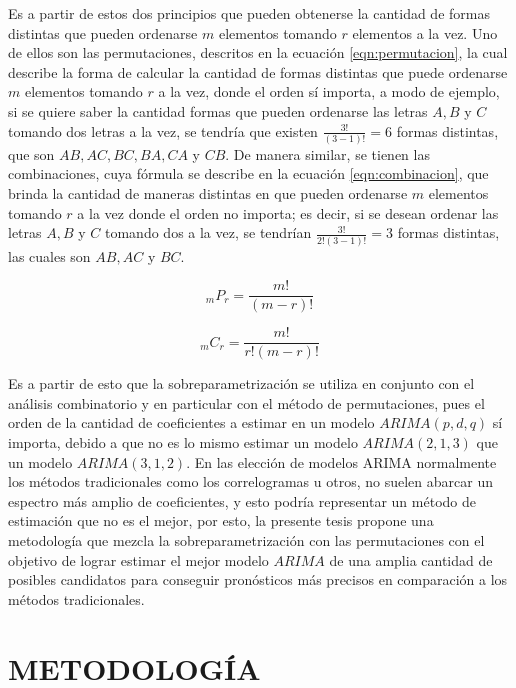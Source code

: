 \documentclass[
]{article}
\begin{document}
Es a partir de estos dos principios que pueden obtenerse la cantidad de
formas distintas que pueden ordenarse \(m\) elementos tomando \(r\)
elementos a la vez. Uno de ellos son las permutaciones, descritos en la
ecuación \eqref{eqn:permutacion}, la cual describe la forma de calcular
la cantidad de formas distintas que puede ordenarse \(m\) elementos
tomando \(r\) a la vez, donde el orden sí importa, a modo de ejemplo, si
se quiere saber la cantidad formas que pueden ordenarse las letras
\(A, B\) y \(C\) tomando dos letras a la vez, se tendría que existen
\(\frac{3!}{(3-1)!}=6\) formas distintas, que son \(AB, AC, BC, BA, CA\)
y \(CB\). De manera similar, se tienen las combinaciones, cuya fórmula
se describe en la ecuación \eqref{eqn:combinacion}, que brinda la
cantidad de maneras distintas en que pueden ordenarse \(m\) elementos
tomando \(r\) a la vez donde el orden no importa; es decir, si se desean
ordenar las letras \(A, B\) y \(C\) tomando dos a la vez, se tendrían
\(\frac{3!}{2!(3-1)!}=3\) formas distintas, las cuales son \(AB, AC\) y
\(BC\).

\begin{equation}
\label{eqn:permutacion}
_mP_r=\frac{m!}{(m-r)!}
\end{equation}

\begin{equation}
\label{eqn:combinacion}
_mC_r=\frac{m!}{r!(m-r)!}
\end{equation}

Es a partir de esto que la sobreparametrización se utiliza en conjunto
con el análisis combinatorio y en particular con el método de
permutaciones, pues el orden de la cantidad de coeficientes a estimar en
un modelo \(ARIMA(p,d,q)\) sí importa, debido a que no es lo mismo
estimar un modelo \(ARIMA(2,1,3)\) que un modelo \(ARIMA(3,1,2)\). En
las elección de modelos ARIMA normalmente los métodos tradicionales como
los correlogramas u otros, no suelen abarcar un espectro más amplio de
coeficientes, y esto podría representar un método de estimación que no
es el mejor, por esto, la presente tesis propone una metodología que
mezcla la sobreparametrización con las permutaciones con el objetivo de
lograr estimar el mejor modelo \(ARIMA\) de una amplia cantidad de
posibles candidatos para conseguir pronósticos más precisos en
comparación a los métodos tradicionales.

\newpage

\section{METODOLOGÍA} 
\end{document}

